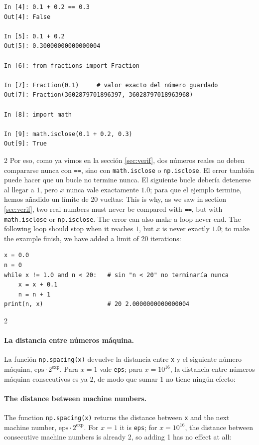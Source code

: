 \begin{verbatim}
In [4]: 0.1 + 0.2 == 0.3
Out[4]: False

In [5]: 0.1 + 0.2
Out[5]: 0.30000000000000004

In [6]: from fractions import Fraction

In [7]: Fraction(0.1)     # valor exacto del número guardado
Out[7]: Fraction(3602879701896397, 36028797018963968)

In [8]: import math

In [9]: math.isclose(0.1 + 0.2, 0.3)
Out[9]: True
\end{verbatim}
\begin{paracol}{2}
Por eso, como ya vimos en la sección \ref{sec:verif}, dos números reales no deben compararse nunca con \texttt{==}, sino con \texttt{math.isclose} o \texttt{np.isclose}. El error también puede hacer que un bucle no termine nunca. El siguiente bucle debería detenerse al llegar a $1$, pero $x$ nunca vale exactamente $1.0$; para que el ejemplo termine, hemos añadido un límite de 20 vueltas:
\switchcolumn
This is why, as we saw in section \ref{sec:verif}, two real numbers must never be compared with \texttt{==}, but with \texttt{math.isclose} or \texttt{np.isclose}. The error can also make a loop never end. The following loop should stop when it reaches $1$, but $x$ is never exactly $1.0$; to make the example finish, we have added a limit of 20 iterations:
\end{paracol}
\begin{verbatim}
x = 0.0
n = 0
while x != 1.0 and n < 20:   # sin "n < 20" no terminaría nunca
    x = x + 0.1
    n = n + 1
print(n, x)                  # 20 2.0000000000000004
\end{verbatim}
\begin{paracol}{2}
\paragraph{La distancia entre números máquina.} La función \texttt{np.spacing(x)} devuelve la distancia entre \texttt{x} y el siguiente número máquina, $\text{eps}\cdot2^{\text{exp}}$. Para $x=1$ vale \texttt{eps}; para $x=10^{16}$, la distancia entre números máquina consecutivos es ya 2, de modo que sumar 1 no tiene ningún efecto:
\switchcolumn
\paragraph{The distance between machine numbers.} The function \texttt{np.spacing(x)} returns the distance between \texttt{x} and the next machine number, $\text{eps}\cdot2^{\text{exp}}$. For $x=1$ it is \texttt{eps}; for $x=10^{16}$, the distance between consecutive machine numbers is already 2, so adding 1 has no effect at all:
\end{paracol}
